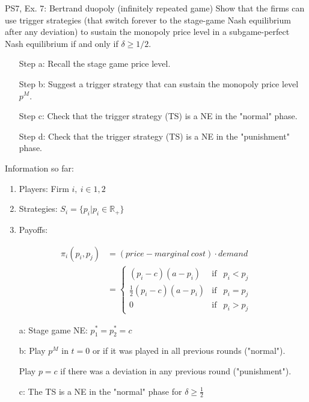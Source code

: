 \begin{frame}{PS7, Ex. 7: Bertrand duopoly (infinitely repeated game)}
    Show that the firms can use trigger strategies (that switch forever to the stage-game Nash equilibrium after any deviation) to sustain the monopoly price level in a subgame-perfect Nash equilibrium if and only if $\delta\geq1/2$.
    \vspace{-6pt}
    \begin{multicols}{2}
      \begin{itemize}
        \item[Step a:] Recall the stage game price level.
        \item[Step b:] Suggest a trigger strategy that can sustain the monopoly price level $p^M$.
        \item[Step c:] Check that the trigger strategy (TS) is a NE in the "normal" phase.
        \item[Step d:] Check that the trigger strategy (TS) is a NE in the "punishment" phase.
      \end{itemize}
      \vfill\null\columnbreak
      Information so far:
      \vspace{-4pt}
      \begin{enumerate}
        \item Players: Firm $i,\ i\in1,2$
        \item Strategies: $S_i=\{p_i|p_i\in\mathbb{R}_+\}$
        \item Payoffs:
      \end{enumerate}
      \vspace{-12pt}
      \begin{align*}
        \pi_i(p_i,p_j)&=(price-marginal\ cost)\cdot demand\\
                      &=\left\{\begin{array}{lcl}
          (p_i-c)(a-p_i)            & \text{if} & p_i<p_j\\
          \frac{1}{2}(p_i-c)(a-p_i) & \text{if} & p_i=p_j\\
          0                         & \text{if} & p_i>p_j
        \end{array}\right.
      \end{align*}
      \vspace{-16pt}
      \begin{itemize}
        \item[a:] Stage game NE: $p_1^*=p_2^*=c$
        \item[b:] Play $p^M$ in $t=0$ or if it was played in all previous rounds ("normal").
        \item[]   Play $p=c$ if there was a deviation in any previous round ("punishment").
        \item[c:] The TS is a NE in the "normal" phase for $\delta\geq\frac{1}{2}$
      \end{itemize}
      \vfill\null
    \end{multicols}
\end{frame}
